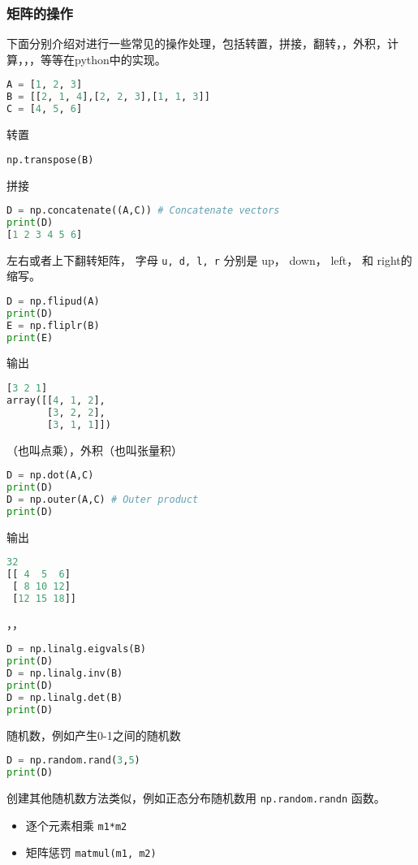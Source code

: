 \subsubsection{矩阵的操作}
下面分别介绍对进行一些常见的操作处理，包括转置，拼接，翻转，，外积，计算，，，等等在python中的实现。
\begin{lstlisting}[language=python]
A = [1, 2, 3]
B = [[2, 1, 4],[2, 2, 3],[1, 1, 3]]
C = [4, 5, 6]
\end{lstlisting}
转置
\begin{lstlisting}[language=python]
np.transpose(B)
\end{lstlisting}
拼接
\begin{lstlisting}[language=python]
D = np.concatenate((A,C)) # Concatenate vectors
print(D)
[1 2 3 4 5 6]
\end{lstlisting}
左右或者上下翻转矩阵， 字母 \verb|u, d, l, r| 分别是 up， down，  left， 和  right的缩写。
\begin{lstlisting}[language=python]
D = np.flipud(A) 
print(D)
E = np.fliplr(B) 
print(E)
\end{lstlisting}
输出
\begin{lstlisting}[language=python]
[3 2 1]
array([[4, 1, 2],
       [3, 2, 2],
       [3, 1, 1]])
\end{lstlisting}
（也叫点乘），外积（也叫张量积）
\begin{lstlisting}[language=python]
D = np.dot(A,C) 
print(D)
D = np.outer(A,C) # Outer product
print(D)
\end{lstlisting}
输出
\begin{lstlisting}[language=python]
32
[[ 4  5  6]
 [ 8 10 12]
 [12 15 18]]
\end{lstlisting}
，，
\begin{lstlisting}[language=python]
D = np.linalg.eigvals(B) 
print(D)
D = np.linalg.inv(B)
print(D)
D = np.linalg.det(B)
print(D)
\end{lstlisting}
随机数，例如产生0-1之间的随机数
\begin{lstlisting}[language=python]
D = np.random.rand(3,5) 
print(D)
\end{lstlisting}
创建其他随机数方法类似，例如正态分布随机数用 \verb|np.random.randn| 函数。

\begin{itemize}
\item 逐个元素相乘 \verb|m1*m2|
\item 矩阵惩罚 \verb|matmul(m1, m2)|
\end{itemize}
